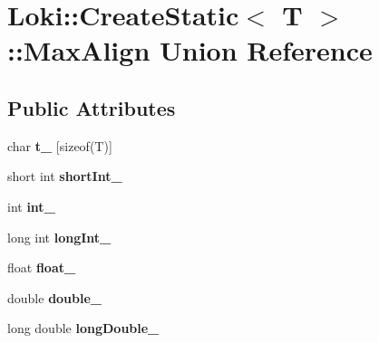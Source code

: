 \hypertarget{unionLoki_1_1CreateStatic_1_1MaxAlign}{}\section{Loki\+:\+:Create\+Static$<$ T $>$\+:\+:Max\+Align Union Reference}
\label{unionLoki_1_1CreateStatic_1_1MaxAlign}
\subsection*{Public Attributes}
\begin{DoxyCompactItemize}
\item 
\hypertarget{unionLoki_1_1CreateStatic_1_1MaxAlign_a835ed6789bc22873073df4255e4d17ad}{}char {\bfseries t\+\_\+} \mbox{[}sizeof(T)\mbox{]}\label{unionLoki_1_1CreateStatic_1_1MaxAlign_a835ed6789bc22873073df4255e4d17ad}

\item 
\hypertarget{unionLoki_1_1CreateStatic_1_1MaxAlign_a3fc2379ce723560d2c418150db34dc19}{}short int {\bfseries short\+Int\+\_\+}\label{unionLoki_1_1CreateStatic_1_1MaxAlign_a3fc2379ce723560d2c418150db34dc19}

\item 
\hypertarget{unionLoki_1_1CreateStatic_1_1MaxAlign_abb8e72f885b24a02b515f79cc9bb9ac2}{}int {\bfseries int\+\_\+}\label{unionLoki_1_1CreateStatic_1_1MaxAlign_abb8e72f885b24a02b515f79cc9bb9ac2}

\item 
\hypertarget{unionLoki_1_1CreateStatic_1_1MaxAlign_a7fd035a1c584f44b2e748108fa97a464}{}long int {\bfseries long\+Int\+\_\+}\label{unionLoki_1_1CreateStatic_1_1MaxAlign_a7fd035a1c584f44b2e748108fa97a464}

\item 
\hypertarget{unionLoki_1_1CreateStatic_1_1MaxAlign_a93cab0658e3d4768bc652993979126bd}{}float {\bfseries float\+\_\+}\label{unionLoki_1_1CreateStatic_1_1MaxAlign_a93cab0658e3d4768bc652993979126bd}

\item 
\hypertarget{unionLoki_1_1CreateStatic_1_1MaxAlign_ac94aaffc3c6d947b4a6f2890491e05ad}{}double {\bfseries double\+\_\+}\label{unionLoki_1_1CreateStatic_1_1MaxAlign_ac94aaffc3c6d947b4a6f2890491e05ad}

\item 
\hypertarget{unionLoki_1_1CreateStatic_1_1MaxAlign_af734f85514ed85bbca271da987815811}{}long double {\bfseries long\+Double\+\_\+}\label{unionLoki_1_1CreateStatic_1_1MaxAlign_af734f85514ed85bbca271da987815811}


\end{DoxyCompactItemize}
